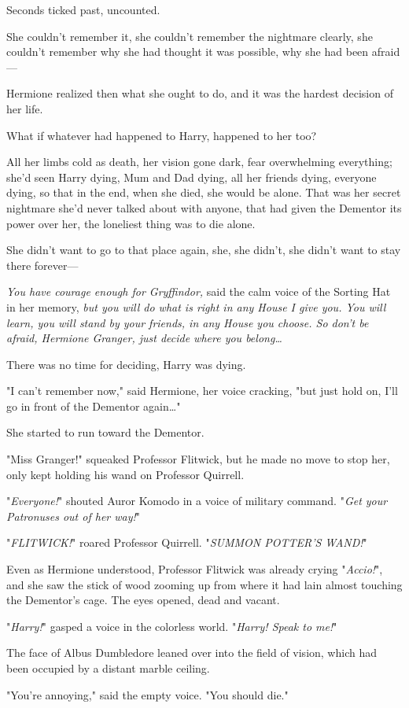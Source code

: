 Seconds ticked past, uncounted.

She couldn't remember it, she couldn't remember the nightmare clearly, she 
couldn't remember why she had thought it was possible, why she had been 
afraid---

Hermione realized then what she ought to do, and it was the hardest decision of 
her life.

What if whatever had happened to Harry, happened to her too?

All her limbs cold as death, her vision gone dark, fear overwhelming 
everything; she'd seen Harry dying, Mum and Dad dying, all her friends dying, 
everyone dying, so that in the end, when she died, she would be alone. That was 
her secret nightmare she'd never talked about with anyone, that had given the 
Dementor its power over her, the loneliest thing was to die alone.

She didn't want to go to that place again, she, she didn't, she didn't want to 
stay there forever---

\emph{You have courage enough for Gryffindor,} said the calm voice of the 
Sorting Hat in her memory, \emph{but you will do what is right in any House I 
give you. You will learn, you will stand by your friends, in any House you 
choose. So don't be afraid, Hermione Granger, just decide where you 
belong{\ldots}}

There was no time for deciding, Harry was dying.

"I can't remember now," said Hermione, her voice cracking, "but just hold on, 
I'll go in front of the Dementor again{\ldots}"

She started to run toward the Dementor.

"Miss Granger!" squeaked Professor Flitwick, but he made no move to stop her, 
only kept holding his wand on Professor Quirrell.

"\emph{Everyone!}" shouted Auror Komodo in a voice of military command. 
"\emph{Get your Patronuses out of her way!}"

"\emph{FLITWICK!}" roared Professor Quirrell. "\emph{SUMMON POTTER'S WAND!}"

Even as Hermione understood, Professor Flitwick was already crying 
"\emph{Accio!}", and she saw the stick of wood zooming up from where it had 
lain almost touching the Dementor's cage.
\sbreak
The eyes opened, dead and vacant.

"\emph{Harry!}" gasped a voice in the colorless world. "\emph{Harry! Speak to 
me!}"

The face of Albus Dumbledore leaned over into the field of vision, which had 
been occupied by a distant marble ceiling.

"You're annoying," said the empty voice. "You should die."